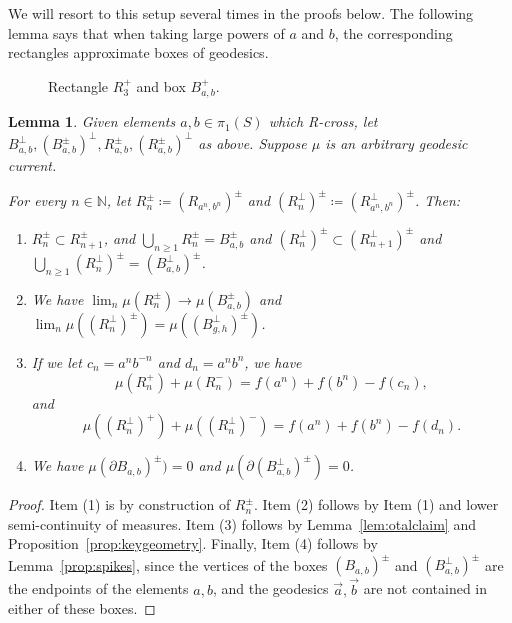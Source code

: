 \documentclass[11pt]{amsart}
\newcommand{\ora}[1]{\overrightarrow{#1}}
\newcommand*{\svgfignormal}[1]{\fontsize{9pt}{9pt}\selectfont}
\numberwithin{equation}{section}
\numberwithin{figure}{section}
\newtheorem{lemma}[theorem]{Lemma}
\theoremstyle{definition}
\theoremstyle{plain}
\begin{document}
We will resort to this setup several times in the proofs below. 
The following lemma  says that when taking large powers of $a$ and $b$, the corresponding rectangles approximate boxes of geodesics.

  \begin{figure}
\centering{
\svgfignormal{rectangles}}
\caption{Rectangle $R_3^+$ and box $B_{a,b}^+$.}
\label{fig:rectangles}
\end{figure}


\begin{lemma} 
Given elements $a, b \in \pi_1(S)$ which R-cross,
let $B_{a,b}^{\perp},(B_{a,b}^{\pm})^{\perp}, R_{a,b}^{\pm}, (R_{a,b}^{\pm})^\perp$ as above. Suppose $\mu$ is an arbitrary geodesic current.

For every $n \in \mathbb{N}$, let $R_n^{\pm}  \coloneqq (R_{a^n,b^n})^{\pm} $ and $(R_n^{\perp})^{\pm}  \coloneqq (R_{a^n,b^n}^{\perp})^{\pm}$.
Then:
\begin{enumerate} 
\item $R_n^{\pm}  \subset R_{n+1}^{\pm}$, and $\bigcup_{n \geq 1} R_n^{\pm}  = B_{a,b}^{\pm}$ and $(R_n^{\perp})^{\pm}  \subset (R_{n+1}^{\perp})^{\pm}$ and $\bigcup_{n \geq 1} (R_n^{\perp})^{\pm} = (B_{a,b}^{\perp})^{\pm}$.
\item We have $\lim_{n} \mu(R_n^{\pm}) \to \mu(B_{a,b}^{\pm})$ and $\lim_n \mu((R_n^{\perp})^{\pm})=\mu((B_{g,h}^{\perp})^{\pm})$.
\item  If we let $c_n=a^n b^{-n}$ and $d_n=a^n b^n$, we have 
\begin{equation}\label{eq:Rn-meas}
\mu(R_n^+)+\mu(R_n^-)=f(a^n) + f(b^n)-f(c_n),
\end{equation}
and
\begin{equation}\label{eq:Rn-perp-meas}
\mu((R_n^\perp)^{+}) + \mu((R_n^\perp)^{-})=f(a^n) + f(b^n) -f(d_n).
\end{equation}
\item We have $\mu(\partial B_{a,b})^{\pm})=0$ and $\mu(\partial (B_{a,b}^{\perp})^{\pm})=0$.
\end{enumerate}
\label{lem:measures_parallelogram}
\end{lemma}
\begin{proof}
Item (1) is by construction of $R_n^{\pm}$.
Item (2) follows by Item (1) and lower semi-continuity of measures.
Item (3) follows by Lemma~\ref{lem:otalclaim} and Proposition~\ref{prop:keygeometry}. Finally, Item (4) follows by Lemma~\ref{prop:spikes}, since the vertices of the boxes $(B_{a,b})^{\pm}$ and $(B_{a,b}^{\perp})^{\pm}$ are the endpoints of the elements $a,b$, and the geodesics $\ora{a},\ora{b}$ are not contained in either of these boxes.
\end{proof}
\end{document}
